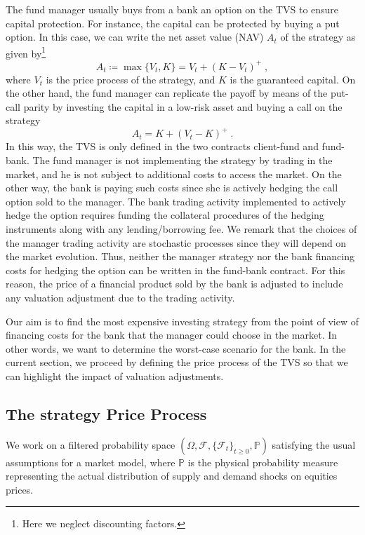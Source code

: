 \documentclass[11pt]{article}
\begin{document}
The fund manager usually buys from a bank an option on the TVS to ensure capital protection. For instance, the capital can be protected by buying a put option. In this case, we can write the net asset value (NAV) $A_t$ of the strategy as given by\footnote{Here we neglect discounting factors.}
\begin{equation}
    A_t \coloneqq \max\{V_t,K\} = V_t + (K-V_t)^+ \; ,
\end{equation}
where $V_t$ is the price process of the strategy, and $K$ is the guaranteed capital. On the other hand, the fund manager can replicate the payoff by means of the put-call parity by investing the capital in a low-risk asset and buying a call on the strategy
\begin{equation}
    A_t = K + (V_t-K)^+ \; .
\end{equation}
In this way, the TVS is only defined in the two contracts client-fund and fund-bank. The fund manager is not implementing the strategy by trading in the market, and he is not subject to additional costs to access the market. On the other way, the bank is paying such costs since she is actively hedging the call option sold to the manager.  The bank trading activity implemented to actively hedge the option requires funding the collateral procedures of the hedging instruments along with any lending/borrowing fee.
We remark that the choices of the manager trading activity are stochastic processes since they will depend on the market evolution. Thus, neither the manager strategy nor the bank financing costs for hedging the option can be written in the fund-bank contract. For this reason, the price of a financial product sold by the bank is adjusted to include any valuation adjustment due to the trading activity.

Our aim is to find the most expensive investing strategy from the point of view of financing costs for the bank that the manager could choose in the market. In other words, we want to determine the worst-case scenario for the bank. In the current section, we proceed by defining the price process of the TVS so that we can highlight the impact of valuation adjustments.


\subsection{The strategy Price Process}
We work on a filtered probability space $\left(\Omega, \mathcal{F}, \{\mathcal{F}_t\}_{t\geq0}, \mathbb{P}  \right)$ satisfying the usual assumptions for a market model, where $\mathbb{P}$ is the physical probability measure representing the actual distribution of supply and demand shocks on equities prices. 
\end{document}
